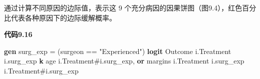 \documentclass[
  chinese-hans,
  letterpaper,
  DIV=11,
  numbers=noendperiod]{scrreprt}
\newenvironment{Shaded}{\begin{snugshade}}{\end{snugshade}}
\newcommand{\KeywordTok}[1]{\textcolor[rgb]{0.00,0.23,0.31}{\textbf{#1}}}
\newcommand{\NormalTok}[1]{\textcolor[rgb]{0.00,0.23,0.31}{#1}}
\newcommand{\StringTok}[1]{\textcolor[rgb]{0.13,0.47,0.30}{#1}}
\begin{document}
通过计算不同原因的边际值，表示这 9
个充分病因的因果饼图（图9.4），红色百分比代表各种原因下的边际缓解概率。

\begin{tcolorbox}[enhanced jigsaw, arc=.35mm, bottomrule=.15mm, breakable, colback=white, colframe=quarto-callout-note-color-frame, left=2mm, leftrule=.75mm, opacityback=0, rightrule=.15mm, toprule=.15mm]

\vspace{-3mm}\textbf{代码9.16}\vspace{3mm}

\begin{Shaded}
\begin{Highlighting}[]
\KeywordTok{gen}\NormalTok{ surg\_exp = (surgeon == }\StringTok{"Experienced"}\NormalTok{)}
\KeywordTok{logit}\NormalTok{ Outcome i.Treatment i.surg\_exp }\KeywordTok{k}\NormalTok{ age i.Treatment\#i.surg\_exp, }\KeywordTok{or}
\NormalTok{margins i.Treatment i.surg\_exp i.Treatment\#i.surg\_exp}
\end{Highlighting}
\end{Shaded}

\end{tcolorbox}
\end{document}
